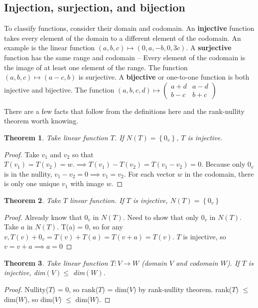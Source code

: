 \documentclass{article}
\newtheorem*{theorem}{Theorem}
\begin{document}
        \subsection{Injection, surjection, and bijection}
            To classify functions, consider their domain and codomain. An \textbf{injective} function takes every element of the domain to a different element of the codomain. An example is the linear function $(a,b,c) \mapsto (0, a, -b, 0, 3c)$. 
            A \textbf{surjective} function has the same range and codomain -- Every element of the codomain is the image of at least one element of the range. The function $(a, b, c) \mapsto (a-c, b)$ is surjective.
            A \textbf{bijective} or one-to-one function is both injective and bijective. The function $(a, b, c, d) \mapsto \begin{pmatrix} a + d & a - d \\ b - c & b + c \end{pmatrix}$

            There are a few facts that follow from the definitions here and the rank-nullity theorem worth knowing.

            \begin{theorem}
                Take linear function $T$. If $N(T) = \left\{0_v\right\}$, $T$ is injective. 
            \end{theorem}
            \begin{proof} 
                Take $v_1$ and $v_2$ so that $T(v_1) = T(v_2) = w. \implies T(v_1) - T(v_2) = T(v_1-v_2) = 0$. Because only $0_v$ is in the nullity, $v_1 - v_2 = 0 \implies v_1 = v_2$. For each vector $w$ in the codomain, there is only one unique $v_1$ with image $w$.
            \end{proof}
            \begin{theorem}
                Take $T$ linear function. If $T$ is injective, $N(T) = \left\{0_v\right\}$
            \end{theorem}
            \begin{proof} 
                Already know that $0_v$ in $N(T)$. 
                Need to show that only $0_v$ in $N(T)$. Take $a$ in $N(T)$. T(a) = 0, so for any $v, T(v) + 0_v = T(v) + T(a) = T(v + a) = T(v)$. $T$ is injective, so $v = v+a \implies a = 0$
            \end{proof}
            \begin{theorem}
                Take linear function $T : V \to W$ (domain $V$ and codomain $W$). If $T$ is injective, dim$(V) \leq $ dim$(W)$.
            \end{theorem}
            \begin{proof}
                Nullity($T$) = 0, so rank($T$) = dim($V$) by rank-nullity theorem. rank($T$) $\leq$ dim($W$), so dim($V$) $\leq$ dim($W$).
            \end{proof}
\end{document}
